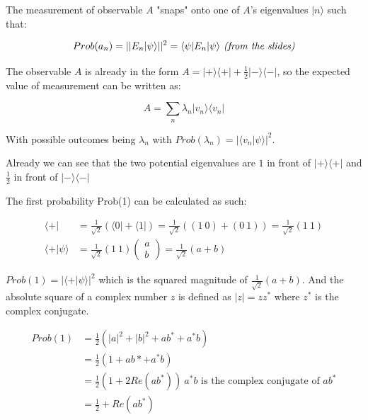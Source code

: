 \documentclass[10pt]{article}
\newcommand{\ket}[1]{\vert #1 \rangle}
\newcommand{\bra}[1]{\langle #1 \vert}
\newcommand{\braket}[2]{\langle #1 \vert #2 \rangle}
\begin{document}
\begin{enumerate}
\begin{enumerate}
        The measurement of observable $A$ "snaps" onto one of $A$'s eigenvalues $\ket{n}$ such that:

        \begin{equation*}
          Prob(a_n) = ||E_n \ket{\psi}||^2 = \bra{\psi} E_n \ket{\psi} \\
          \textit{\ (from the slides)}
        \end{equation*}

        The observable $A$ is already in the form $A = \ket{+}\bra{+} + \frac{1}{2} \ket{-}\bra{-}$, so the expected value of measurement can be written as:

        \begin{equation*}
          A = \sum_n \lambda_n \ket{v_n}\bra{v_n}
        \end{equation*}

        With possible outcomes being $\lambda_n$ with $Prob(\lambda_n) = |\braket{v_n}{\psi}|^2$.

        Already we can see that the two potential eigenvalues are $1$ in front of $\ket{+}\bra{+}$ and $\frac{1}{2}$ in front of $\ket{-}\bra{-}$

        The first probability Prob(1) can be calculated as such:

        \begin{align*}
          \bra{+} &= \frac{1}{\sqrt2}(\bra{0} + \bra{1}) = \frac{1}{\sqrt{2}} (( 1 \ 0 ) + ( 0 \ 1 )) = \frac{1}{\sqrt2} ( 1 \ 1 ) \\
         \braket{+}{\psi} &= \frac{1}{\sqrt2} (1 \ 1) \begin{pmatrix} a \\ b \end{pmatrix} = \frac{1}{\sqrt2}(a + b)
        \end{align*}

        $Prob(1) = |\braket{+}{\psi}|^2$ which is the squared magnitude of $\frac{1}{\sqrt2}(a+b)$. And the absolute square of a complex number $z$ is defined as $|z| = zz^*$ where $z^*$ is the complex conjugate.

        \begin{align*}
          Prob(1) &= \frac12 (|a|^2 + |b|^2 + ab^* + a^*b) \\
                  &= \frac12 (1 + ab* + a^*b) \\
                  &= \frac12 (1 + 2Re(ab^*)) \ a^*b \text{ is the complex conjugate of } ab^* \\
                  &= \frac12 + Re(ab^*)
        \end{align*}


\end{enumerate}
\end{enumerate}
\end{document}
